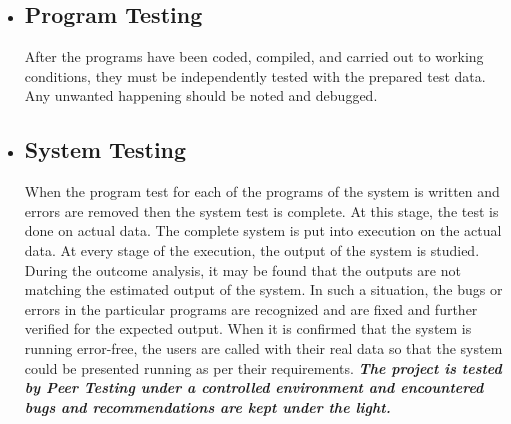 \begin{itemize}
			\item \subsection{Program Testing}
			After the programs have been coded, compiled, and carried out to working conditions, they must be independently tested with the prepared test data. Any unwanted happening should be noted and debugged. 
			
			\item \subsection{System Testing}
			When the program test for each of the programs of the system is written and errors are removed then the system test is complete. At this stage, the test is done on actual data. The complete system is put into execution on the actual data. At every stage of the execution, the output of the system is studied. During the outcome analysis, it may be found that the outputs are not matching the estimated output of the system. In such a situation, the bugs or errors in the particular programs are recognized and are fixed and further verified for the expected output. When it is confirmed that the system is running error-free, the users are called with their real data so that the system could be presented running as per their requirements. 
			\vs
			\textbf{\em The project is tested by Peer Testing under a controlled environment and encountered bugs and recommendations are kept under the light.}
		\end{itemize}
		\pagebreak
